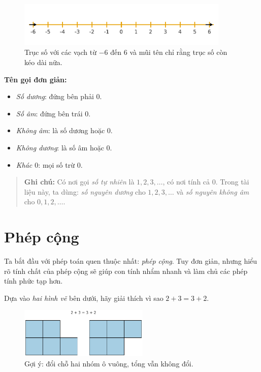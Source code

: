 \begin{figure}[ht!]
  \centering
  \includegraphics[width=0.9\textwidth]{img/fig-numberline.pdf}
  \caption*{\small Trục số với các vạch từ $-6$ đến $6$ và mũi tên chỉ rằng
  trục số còn kéo dài nữa.}
\end{figure}

\noindent\textbf{Tên gọi đơn giản:}
\begin{itemize}
  \item \textit{Số dương}: đứng bên phải $0$.
  \item \textit{Số âm}: đứng bên trái $0$.
  \item \textit{Không âm}: là số dương hoặc $0$.
  \item \textit{Không dương}: là số âm hoặc $0$.
  \item \textit{Khác $0$}: mọi số trừ $0$.
\end{itemize}

\begin{quote}
\textbf{Ghi chú:} Có nơi gọi \emph{số tự nhiên} là $1,2,3,\ldots$,
có nơi tính cả $0$. Trong tài liệu này, ta dùng: \emph{số nguyên dương}
cho $1,2,3,\ldots$ và \emph{số nguyên không âm} cho $0,1,2,\ldots$.
\end{quote}

\section{Phép cộng}

Ta bắt đầu với phép toán quen thuộc nhất: \emph{phép cộng}.
Tuy đơn giản, nhưng hiểu rõ tính chất của phép cộng sẽ giúp con
tính nhẩm nhanh và làm chủ các phép tính phức tạp hơn.

\begin{problem}[1.1]
Dựa vào \emph{hai hình vẽ} bên dưới, hãy giải thích vì sao
$2+3=3+2$.

\begin{figure}[ht!]
  \centering
  \includegraphics[width=0.55\textwidth]{img/fig-prob1.1.pdf}
  \caption*{\small Gợi ý: đổi chỗ hai nhóm ô vuông, tổng vẫn không đổi.}
\end{figure}
\end{problem}

